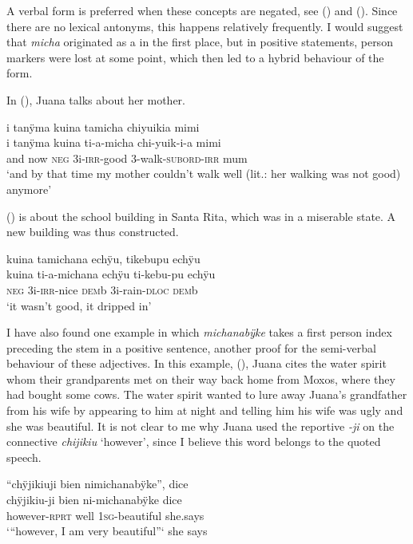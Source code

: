 A verbal form is preferred when these concepts are negated, see () and (). Since there are no lexical antonyms, this happens relatively frequently. I would suggest that \textit{micha} originated as a  in the first place, but in positive statements, person markers were lost at some point, which then led to a hybrid behaviour of the form.

In (), Juana talks about her mother.

\ea\label{ex:ADJ-micha-IRR-1}
\begingl
\glpreamble i tanÿma kuina tamicha chiyuikia mimi\\
\gla i tanÿma kuina ti-a-micha chi-yuik-i-a mimi\\
\glb and now \textsc{neg} 3i-\textsc{irr}-good 3-walk-\textsc{subord}-\textsc{irr} mum\\
\glft ‘and by that time my mother couldn’t walk well (lit.: her walking was not good) anymore’
\endgl
\trailingcitation{[jxx-p120430l-2.499]}
\xe

() is about the school building in Santa Rita, which was in a miserable state. A new building was thus constructed.

\ea\label{ex:michana-2}
\begingl 
\glpreamble kuina tamichana echÿu, tikebupu echÿu\\
\gla kuina ti-a-michana echÿu ti-kebu-pu echÿu\\ 
\glb \textsc{neg} 3i-\textsc{irr}-nice \textsc{dem}b 3i-rain-\textsc{dloc} \textsc{dem}b\\ 
\glft ‘it wasn’t good, it dripped in’
\trailingcitation{[mxx-p110825l.089]}
\xe
{}

I have also found one example in which \textit{michanabÿke} takes a first person index preceding the stem in a positive sentence, another proof for the semi-verbal behaviour of these adjectives. In this example, (), Juana cites the water spirit whom their grandparents met on their way back home from Moxos, where they had bought some cows. The water spirit wanted to lure away Juana’s grandfather from his wife by appearing to him at night and telling him his wife was ugly and she was beautiful. It is not clear to me why Juana used the reportive \textit{-ji} on the connective \textit{chijikiu} ‘however’, since I believe this word belongs to the quoted speech.

\ea\label{ex:pretty-2}
\begingl
\glpreamble “chÿjikiuji bien nimichanabÿke”, dice\\
\gla chÿjikiu-ji bien ni-michanabÿke dice\\
\glb however-\textsc{rprt} well 1\textsc{sg}-beautiful she.says\\
\glft ‘“however, I am very beautiful”‘ she says
\endgl
\trailingcitation{[jxx-p151016l-2.190]}
\xe

